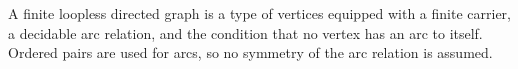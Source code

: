 \begin{definition}
A finite loopless directed graph is a type of vertices equipped with a finite
carrier, a decidable arc relation, and the condition that no vertex has an arc
to itself.  Ordered pairs are used for arcs, so no symmetry of the arc
relation is assumed.
\end{definition}
